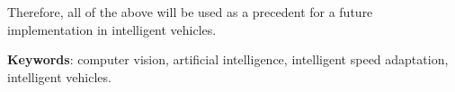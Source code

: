 Therefore, all of the above will be used as a precedent for a future implementation in intelligent vehicles.

\vspace{0.5cm}

\textbf{Keywords}: computer vision, artificial intelligence, intelligent speed adaptation, intelligent vehicles.
\newpage
\thispagestyle{empty}
\hspace*{0.5cm}
\newpage
